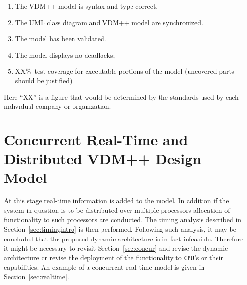 \documentclass{overturerepchap}
\begin{document}
\begin{enumerate}
\item The VDM++ model is syntax and type correct.
\item The UML class diagram and VDM++ model are synchronized.
\item The model has been validated.
\item The model displays no deadlocks;
\item XX\%\ test coverage for executable portions of the model
(uncovered parts should be justified).
\end{enumerate}

Here ``XX'' is a figure that would be determined by the standards used
by each individual company or organization.

\section{Concurrent Real-Time and Distributed VDM++ Design Model}

At this stage real-time information is added to the model. In addition
if the system in question is to be distributed over multiple
processors allocation of functionality to such processors are
conducted. The timing analysis described in
Section~\ref{sec:timingintro} is then performed. Following such
analysis, it may be concluded that the proposed dynamic architecture
is in fact infeasible. Therefore it might be necessary to revisit
Section~\ref{sec:concur} and revise the dynamic architecture or revise
the deployment of the functionality to \texttt{CPU}'s or 
their capabilities. An
example of a concurrent real-time model is given in
Section~\ref{sec:realtime}.


\end{document}
